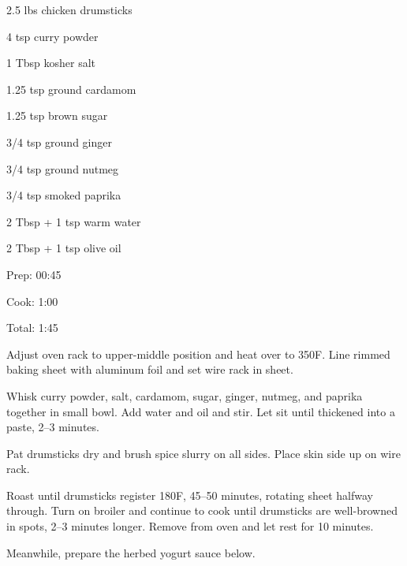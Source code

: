 \documentclass[oneside]{book}  %
\newcommand{\degF}{\textdegree F\xspace}
\begin{document}
\begin{IT}
  \begin{ingredients}
    \item[2.5 lbs] chicken drumsticks
    \item[4 tsp] curry powder
    \item[1 Tbsp] kosher salt
    \item[1.25 tsp] ground cardamom
    \item[1.25 tsp] brown sugar
    \item[3/4 tsp] ground ginger
    \item[3/4 tsp] ground nutmeg
    \item[3/4 tsp] smoked paprika
    \item[2 Tbsp + 1 tsp] warm water
    \item[2 Tbsp + 1 tsp] olive oil
  \end{ingredients}

  \switchcolumn

  \begin{timeline}
    \item[Prep:]  00:45
    \item[Cook:]  1:00
    \item[Total:] 1:45
  \end{timeline}
\end{IT}

\begin{directions}
  \item Adjust oven rack to upper-middle position and heat over to 350\degF.
    Line rimmed baking sheet with aluminum foil and set wire rack in sheet.

  \item Whisk curry powder, salt, cardamom, sugar, ginger, nutmeg, and paprika
    together in small bowl. Add water and oil and stir. Let sit until thickened
    into a paste, 2--3 minutes.

  \item Pat drumsticks dry and brush spice slurry on all sides. Place skin side
    up on wire rack.

  \item Roast until drumsticks register 180\degF, 45--50 minutes, rotating
    sheet halfway through. Turn on broiler and continue to cook until drumsticks
    are well-browned in spots, 2--3 minutes longer. Remove from oven and let
    rest for 10 minutes.

  \item Meanwhile, prepare the herbed yogurt sauce below.
\end{directions}
\end{document}

